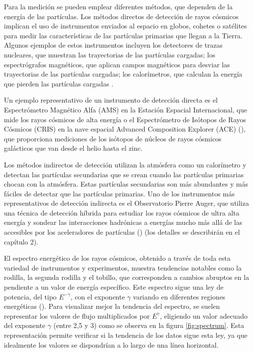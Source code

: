 Para la medición se pueden emplear diferentes métodos, que dependen de la energía de las partículas. Los métodos directos de detección de rayos cósmicos implican el uso de instrumentos enviados al espacio en globos, cohetes o satélites para medir las características de las partículas primarias que llegan a la Tierra. Algunos ejemplos de estos instrumentos incluyen los detectores de trazas nucleares, que muestran las trayectorias de las partículas cargadas; los espectrógrafos magnéticos, que aplican campos magnéticos para desviar las trayectorias de las partículas cargadas; los calorímetros, que calculan la energía que pierden las partículas cargadas \cite{tomassetti_2023}.

Un ejemplo representativo de un instrumento de detección directa es el Espectrómetro Magnético Alfa (AMS) en la Estación Espacial Internacional, que mide los rayos cósmicos de alta energía o el Espectrómetro de Isótopos de Rayos Cósmicos (CRIS) en la nave espacial Advanced Composition Explorer (ACE) (\cite{tomassetti_2023}), que proporciona mediciones de los isótopos de núcleos de rayos cósmicos galácticos que van desde el helio hasta el zinc.

Los métodos indirectos de detección utilizan la atmósfera como un calorímetro y detectan las partículas secundarias que se crean cuando las partículas primarias chocan con la atmósfera. Estas partículas secundarias son más abundantes y más fáciles de detectar que las partículas primarias. Uno de los instrumentos más representativos de detección indirecta es el Observatorio Pierre Auger, que utiliza una técnica de detección híbrida para estudiar los rayos cósmicos de ultra alta energía y sondear las interacciones hadrónicas a energías mucho más allá de las accesibles por los aceleradores de partículas (\cite{engel_2021}) (los detalles se describirán en el capítulo 2).

El espectro energético de los rayos cósmicos, obtenido a través de toda esta variedad de instrumentos y experimentos, muestra tendencias notables como la rodilla, la segunda rodilla y el tobillo, que corresponden a cambios abruptos en la pendiente a un valor de energía específico. Este espectro sigue una ley de potencia, del tipo $E^{-\gamma}$, con el exponente $\gamma$ variando en diferentes regiones energéticas (\cite{Riggi_2023}). Para visualizar mejor la tendencia del espectro, se suelen representar los valores de flujo multiplicados por $E^{\gamma}$, eligiendo un valor adecuado del exponente $\gamma$ (entre 2,5 y 3) como se observa en la figura \ref{fig:spectrum}. Esta representación permite verificar si la tendencia de los datos sigue esta ley, ya que idealmente los valores se dispondrían a lo largo de una línea horizontal.

